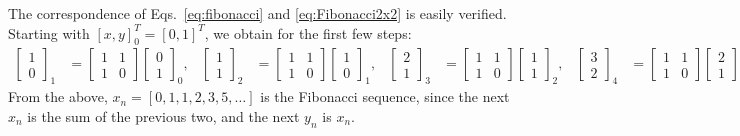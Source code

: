 \documentclass{ximera}
\begin{document}
The correspondence of Eqs.~\ref{eq:fibonacci} and \ref{eq:Fibonacci2x2} is easily verified.
	{%
Starting with $[x,y]_0^T= [0,1]^T$, we obtain for the first few steps:
\begin{align*}
\begin{bmatrix}
1 \\ 0
\end{bmatrix}_1
 &=
\begin{bmatrix}
1 & 1 \\
1 & 0
\end{bmatrix}
\begin{bmatrix}
0 \\ 1
\end{bmatrix}_0,
 &
\begin{bmatrix}
1 \\ 1
\end{bmatrix}_2
 &=
\begin{bmatrix}
1 & 1 \\
1 & 0
\end{bmatrix}
\begin{bmatrix}
1 \\ 0
\end{bmatrix}_1,
 &
%
\begin{bmatrix}
2 \\ 1
\end{bmatrix}_3
 &=
\begin{bmatrix}
1 & 1 \\
1 & 0
\end{bmatrix}
\begin{bmatrix}
1 \\ 1
\end{bmatrix}_2,
 &
%
\begin{bmatrix}
3 \\ 2
\end{bmatrix}_4
 &=
\begin{bmatrix}
1 & 1 \\
1 & 0
\end{bmatrix}
\begin{bmatrix}
2 \\ 1
\end{bmatrix}_3,
 &
\dots .
&
\end{align*}
From the above, $x_n = [0, 1, 1, 2, 3, 5, \ldots ]$ is the Fibonacci sequence, since the next $x_n$ is
the sum of the previous two, and the next $y_{n}$ is $x_n$.
 }%

\end{document}
